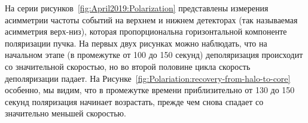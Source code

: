 На серии рисунков~\ref{fig:April2019:Polarization} представлены измерения асимметрии частоты событий на верхнем и нижнем детекторах (так называемая асимметрия верх-низ), которая пропорциональна горизонтальной компоненте поляризации пучка. На первых двух рисунках можно наблюдать, что на начальном этапе (в промежутке от 100 до 150 секунд) деполяризация происходит со значительной скоростью, но во второй половине цикла скорость деполяризации падает. На Рисунке~\ref{fig:Polariation:recovery-from-halo-to-core} особенно, мы видим, что в промежутке времени приблизительно от 130 до 150 секунд поляризация начинает возрастать, прежде чем снова спадает со значительно меньшей скоростью.
\begin{figure}[h]\centering
\end{figure}
